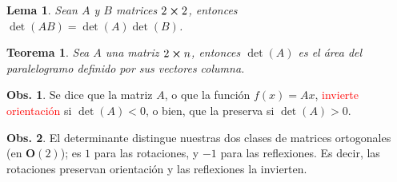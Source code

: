 \documentclass{article}
\theoremstyle{definicion}
\theoremstyle{definition}             %
\theoremstyle{definition}             %
\theoremstyle{definition}
\theoremstyle{definition}
\theoremstyle{observacion}
\newtheorem{obs}{Obs.}
\theoremstyle{definition}
\theoremstyle{plain}
\newtheorem{lemma}{Lema}
\newtheorem{theorem}{Teorema}
\theoremstyle{definition}
\theoremstyle{afirmacion}
\theoremstyle{notation}
\theoremstyle{definition}
\begin{document}
    \begin{lemma}
        Sean \(A\) y \(B\) matrices \(2 \cross 2\), entonces \(\det(AB) = \det(A)\det(B)\).
    \end{lemma}

    \begin{theorem}
        Sea \(A\) una matriz \(2 \cross n\), entonces \(\det(A)\) es el área del paralelogramo definido por sus vectores columna.
    \end{theorem}

    \begin{obs}
        Se dice que la matriz \(A\), o que la función \(f(x) = Ax\), \textcolor{red}{invierte orientación} si \(\det(A) < 0\), o bien, que la preserva si \(\det(A) > 0\).
    \end{obs}

    \begin{obs}
        El determinante distingue nuestras dos clases de matrices ortogonales (en \(\bm{O}(2)\)); es \(1\) para las rotaciones, y \(-1\) para las reflexiones. Es decir, las rotaciones preservan orientación y las reflexiones la invierten.
    \end{obs}
\end{document}
